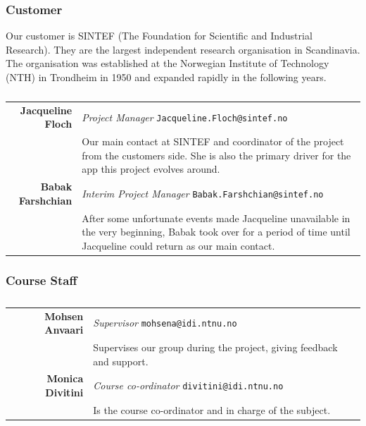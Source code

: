 \subsubsection{Customer}
Our customer is SINTEF (The Foundation for Scientific and Industrial Research). They are the largest independent research organisation in Scandinavia. The organisation was established at the Norwegian Institute of Technology (NTH) in Trondheim in 1950 and expanded rapidly in the following years.

\begin{table}[!ht]
\begin{tabular}{r|p{11cm}}
\textbf{Jacqueline Floch} & \emph{Project Manager}   \texttt{Jacqueline.Floch@sintef.no}\\[4pt]
& Our main contact at SINTEF and coordinator of the project from the customers side. She is also the primary driver for the app this project evolves around. \\[8pt]
\textbf{Babak Farshchian} & \emph{Interim Project Manager}   \texttt{Babak.Farshchian@sintef.no}\\[4pt]
& After some unfortunate events made Jacqueline unavailable in the very beginning, Babak took over for a period of time until Jacqueline could return as our main contact. \\
\end{tabular}
\captionsetup{textformat=empty,labelformat=blank}
\caption[Customer]{}
\end{table}

\subsubsection{Course Staff}

\begin{table}[!ht]
\begin{tabular}{r|p{11cm}}
\textbf{Mohsen Anvaari} & \emph{Supervisor}   \texttt{mohsena@idi.ntnu.no}\\[6pt]
& Supervises our group during the project, giving feedback and support. \\[8pt]
\textbf{Monica Divitini} & \emph{Course co-ordinator}   \texttt{divitini@idi.ntnu.no}\\[6pt]
& Is the course co-ordinator and in charge of the subject.\\
\end{tabular}
\captionsetup{textformat=empty,labelformat=blank}
\caption[Course Staff]{}
\end{table}

